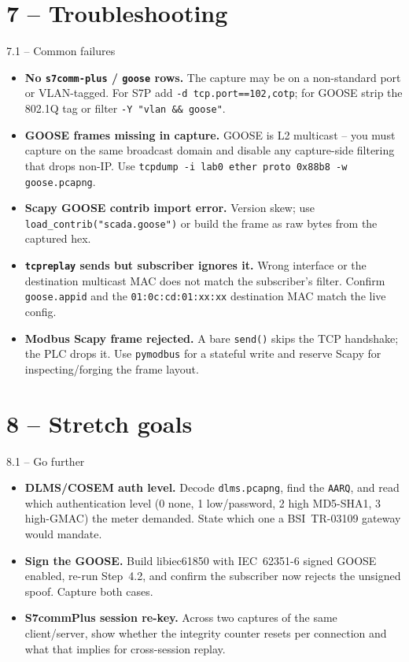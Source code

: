 \documentclass[11pt,a4paper]{article}
\begin{document}
\section*{7 -- Troubleshooting}

\begin{stepbox}{7.1 -- Common failures}
\begin{itemize}[leftmargin=*, nosep]
  \item \textbf{No \texttt{s7comm-plus} / \texttt{goose} rows.} The
        capture may be on a non-standard port or VLAN-tagged. For S7P add
        \texttt{-d tcp.port==102,cotp}; for GOOSE strip the 802.1Q tag or
        filter \texttt{-Y "vlan \&\& goose"}.
  \item \textbf{GOOSE frames missing in capture.} GOOSE is L2 multicast --
        you must capture on the same broadcast domain and disable any
        capture-side filtering that drops non-IP. Use
        \texttt{tcpdump -i lab0 ether proto 0x88b8 -w goose.pcapng}.
  \item \textbf{Scapy GOOSE contrib import error.} Version skew; use
        \texttt{load\_contrib("scada.goose")} or build the frame as raw
        bytes from the captured hex.
  \item \textbf{\texttt{tcpreplay} sends but subscriber ignores it.} Wrong
        interface or the destination multicast MAC does not match the
        subscriber's filter. Confirm \texttt{goose.appid} and the
        \texttt{01:0c:cd:01:xx:xx} destination MAC match the live config.
  \item \textbf{Modbus Scapy frame rejected.} A bare \texttt{send()} skips
        the TCP handshake; the PLC drops it. Use \texttt{pymodbus} for a
        stateful write and reserve Scapy for inspecting/forging the frame
        layout.
\end{itemize}
\end{stepbox}

\section*{8 -- Stretch goals}

\begin{stepbox}{8.1 -- Go further}
\begin{itemize}[leftmargin=*, nosep]
  \item \textbf{DLMS/COSEM auth level.} Decode \texttt{dlms.pcapng}, find
        the \texttt{AARQ}, and read which authentication level (0 none,
        1 low/password, 2 high MD5-SHA1, 3 high-GMAC) the meter demanded.
        State which one a BSI~TR-03109 gateway would mandate.
  \item \textbf{Sign the GOOSE.} Build libiec61850 with IEC~62351-6 signed
        GOOSE enabled, re-run Step~4.2, and confirm the subscriber now
        rejects the unsigned spoof. Capture both cases.
  \item \textbf{S7commPlus session re-key.} Across two captures of the same
        client/server, show whether the integrity counter resets per
        connection and what that implies for cross-session replay.
\end{itemize}
\end{stepbox}
\end{document}
